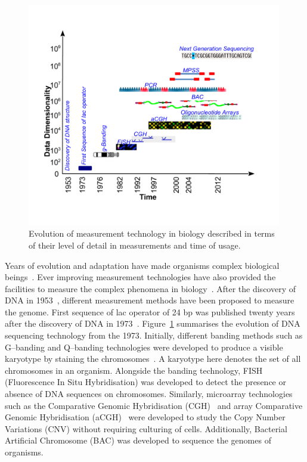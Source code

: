 \begin{figure}[h!]
\centering
\includegraphics[trim=10mm 20mm 20mm 2mm,width=0.99\textwidth]{figures/arraytypes}
\caption[Evolution of measurement in biology.] {Evolution of measurement technology
in biology described in terms of their level of detail in measurements and time of usage. } 
\label{Fig:arraytypes}
\end{figure}

Years of evolution and adaptation have made organisms complex biological 
beings~\cite{mcshea1991}. Ever improving measurement technologies have also 
provided the facilities to measure the complex phenomena in biology~\cite{united2009new}. 
After the discovery of DNA in 1953~\cite{watson1953dna}, different measurement
methods have been proposed to measure the ge\-nome. First sequence of lac 
operator of 
24 bp was published twenty years after the discovery of DNA in 1973~\cite{gilbert1973nucleotide}. 
Figure~\ref{Fig:arraytypes} summarises the evolution of DNA sequencing
technology from the 1973. Initially, different banding methods such as 
G--banding and Q--banding technologies were developed to produce a visible 
karyotype by staining the chromosomes~\cite{benn1992}. A karyotype here 
denotes the  set of all chromosomes in an organism. Alongside the banding 
technology, FISH (Fluorescence In Situ Hybridisation) was developed to
detect the presence or absence of DNA sequences on chromosomes. Similarly, 
microarray technologies such as the  Comparative Genomic Hybridisation 
(CGH)~\cite{kallioniemi92} and array Comparative Genomic Hybridisation 
(aCGH)~\cite{pinkel98} were developed to study the Copy Number Variations 
(CNV) without requiring culturing of cells. Additionally, Bacterial 
Artificial Chromosome (BAC) was developed to sequence the genomes of 
organisms. 


